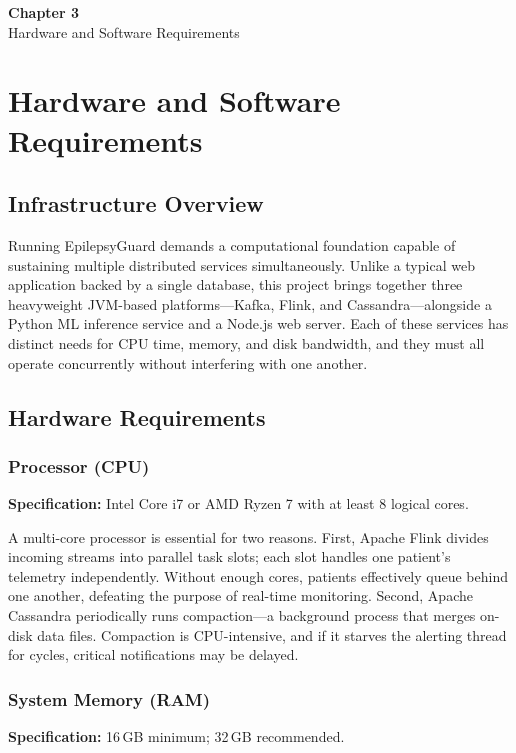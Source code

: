 \documentclass[12pt, a4paper, oneside]{report}
\newcommand{\chapterpage}[2]{
    \cleardoublepage
    \thispagestyle{empty}
    \vspace*{\fill}
    \begin{center}
        \huge \textbf{Chapter #1} \\
        \vspace{1cm}
        \Huge #2
    \end{center}
    \vspace*{\fill}
    \newpage
}
\begin{document}
\chapterpage{3}{Hardware and Software Requirements}
\chapter{Hardware and Software Requirements}

\section{Infrastructure Overview}
Running EpilepsyGuard demands a computational foundation capable of sustaining multiple distributed services simultaneously. Unlike a typical web application backed by a single database, this project brings together three heavyweight JVM-based platforms---Kafka, Flink, and Cassandra---alongside a Python ML inference service and a Node.js web server. Each of these services has distinct needs for CPU time, memory, and disk bandwidth, and they must all operate concurrently without interfering with one another.

\section{Hardware Requirements}

\subsection{Processor (CPU)}
\textbf{Specification:} Intel Core i7 or AMD Ryzen 7 with at least 8 logical cores.

A multi-core processor is essential for two reasons. First, Apache Flink divides incoming streams into parallel task slots; each slot handles one patient's telemetry independently. Without enough cores, patients effectively queue behind one another, defeating the purpose of real-time monitoring. Second, Apache Cassandra periodically runs compaction---a background process that merges on-disk data files. Compaction is CPU-intensive, and if it starves the alerting thread for cycles, critical notifications may be delayed.

\subsection{System Memory (RAM)}
\textbf{Specification:} 16\,GB minimum; 32\,GB recommended.
\end{document}
